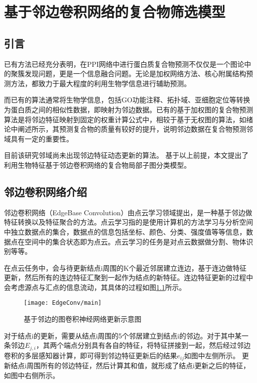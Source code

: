 \chapter{基于邻边卷积网络的复合物筛选模型}
\label{chapter:EdgeConv}
\section{引言}
\label{section:EdgeConv:Put}

已有方法已经充分表明，在PPI网络中进行蛋白质复合物预测不仅仅是一个图论中的聚簇发现问题，更是一个信息融合问题。无论是加权网络方法、核心附属结构预测方法，都致力于最大程度的利用生物学信息进行辅助预测。

而已有的算法通常将生物学信息，包括GO功能注释、拓扑域、亚细胞定位等转换为蛋白质之间的相似性数据，即映射为邻边数据。已有的基于加权图的复合物预测算法是将邻边特征映射到固定的权重计算公式中，相较于基于无权图的算法，如绪论中阐述所示，其预测复合物的质量有较好的提升，说明邻边数据在复合物预测邻域具有一定的重要性。

目前该研究邻域尚未出现邻边特征动态更新的算法。
基于以上前提，本文提出了利用生物特征基于邻边卷积网络的复合物局部子图分类模型。

\section{邻边卷积网络介绍}
\label{section:EdgeConv:intro}

邻边卷积网络（EdgeBase Convolution）由点云学习领域提出，是一种基于邻边做特征转换以及特征聚合的方法。点云学习指的是使用计算机的方法学习与分析空间中独立数据点的集合，数据点的信息包括坐标、颜色、分类、强度值等等信息，数据点在空间中的集合状态即为点云。点云学习的任务是对点云数据做分割、物体识别等等。

在点云任务中，会与待更新结点i周围的K个最近邻居建立连边，基于连边做特征更新，然后所有的连边特征汇聚到一起作为结点的新特征。连边特征更新的过程中会考虑源点与汇点的信息流动，其具体的过程如图\ref{fig:EdgeConv/main}所示。
\begin{figure}[htbp]
    \centering
    \texttt{[image: EdgeConv/main]}
    \caption{基于邻边的图卷积神经网络更新示意图}
    \label{fig:EdgeConv/main}
\end{figure}
对于结点i的更新，需要从结点i周围的5个邻居建立到结点i的邻边。对于其中某一条邻边$E_{j,i}$，其两个端点分别具有各自的特征，将特征拼接到一起，然后经过邻边卷积的多层感知器计算，即可得到邻边特征更新后的结果$e_{ij}$如图中左侧所示。
更新结点i周围所有的邻边特征，然后计算其和值，就形成了结点i更新之后的特征，如图中右侧所示。




